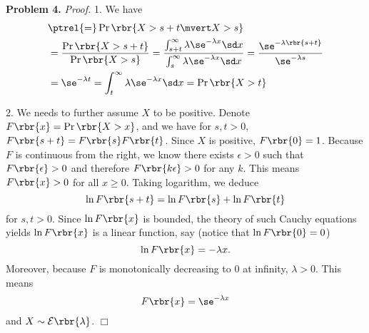 \documentclass[english, nochinese]{pnote}
\DeclareMathOperator\oppr{\mathrm{Pr}}
\begin{document}
\textbf{Problem 4.} \textit{Proof.} 1. We have
\begin{equation}
\begin{split}
&\ptrel{=} \oppr \rbr{ X > s + t \mvert X > s } \\
&= \frac{ \oppr \rbr{ X > s + t } }{ \oppr \rbr{ X > s } } = \frac{ \int_{ s + t }^{\infty}{ \lambda \se^{ -\lambda x } \sd x } }{ \int_s^{\infty}{ \lambda \se^{ -\lambda x } \sd x } } = \frac{\se^{ -\lambda \rbr{ s + t } }}{\se^{ -\lambda s }} \\
&= \se^{ -\lambda t } = \int_t^{\infty} \lambda \se^{ -\lambda x } \sd x = \oppr \rbr{ X > t }
\end{split}
\end{equation}

2. We needs to further assume $X$ to be positive. Denote $ F \rbr{x} = \oppr \rbr{ X > x } $, and we have for $ s, t > 0 $, $ F \rbr{ s + t } = F \rbr{s} F \rbr{t} $. Since $X$ is positive, $ F \rbr{0} = 1 $. Because $F$ is continuous from the right, we know there exists $ \epsilon > 0 $ such that $ F \rbr{\epsilon} > 0 $ and therefore $ F \rbr{ k \epsilon } > 0 $ for any $k$. This means $ F \rbr{x} > 0 $ for all $ x \ge 0 $. Taking logarithm, we deduce
\begin{equation}
\ln F \rbr{ s + t } = \ln F \rbr{s} + \ln F \rbr{t}
\end{equation}
for $ s, t > 0 $. Since $ \ln F \rbr{x} $ is bounded, the theory of such Cauchy equations yields $ \ln F \rbr{x} $ is a linear function, say (notice that $ \ln F \rbr{0} = 0 $)
\begin{equation}
\ln F \rbr{x} = -\lambda x.
\end{equation}
Moreover, because $F$ is monotonically decreasing to $0$ at infinity, $ \lambda > 0 $.
This means
\begin{equation}
F \rbr{x} = \se^{ -\lambda x }
\end{equation}
and $ X \sim \mathcal{E} \rbr{\lambda} $.
\hfill$\Box$
\end{document}
